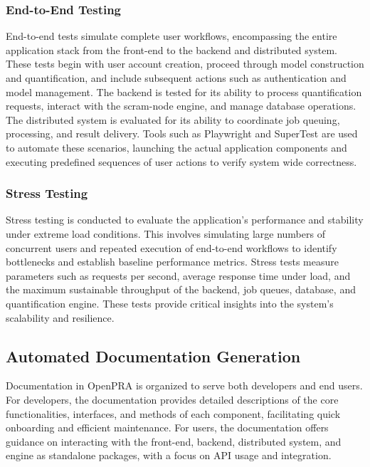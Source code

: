 \subsubsection{End-to-End Testing}

End-to-end tests simulate complete user workflows, encompassing the entire application stack from the front-end to the backend and distributed system. These tests begin with user account creation, proceed through model construction and quantification, and include subsequent actions such as authentication and model management. The backend is tested for its ability to process quantification requests, interact with the scram-node engine, and manage database operations. The distributed system is evaluated for its ability to coordinate job queuing, processing, and result delivery. Tools such as Playwright and SuperTest are used to automate these scenarios, launching the actual application components and executing predefined sequences of user actions to verify system wide correctness.

\subsubsection{Stress Testing}

Stress testing is conducted to evaluate the application's performance and stability under extreme load conditions. This involves simulating large numbers of concurrent users and repeated execution of end-to-end workflows to identify bottlenecks and establish baseline performance metrics. Stress tests measure parameters such as requests per second, average response time under load, and the maximum sustainable throughput of the backend, job queues, database, and quantification engine. These tests provide critical insights into the system's scalability and resilience.



\subsection{Automated Documentation Generation}

Documentation in OpenPRA is organized to serve both developers and end users. For developers, the documentation provides detailed descriptions of the core functionalities, interfaces, and methods of each component, facilitating quick onboarding and efficient maintenance. For users, the documentation offers guidance on interacting with the front-end, backend, distributed system, and engine as standalone packages, with a focus on API usage and integration.

